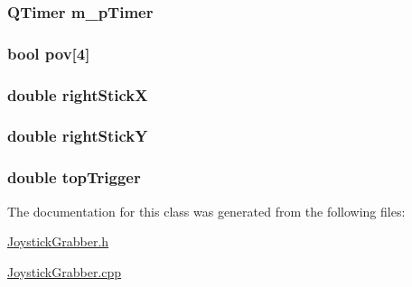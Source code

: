 \hypertarget{a00005_a8ba25017352f50469eddacb322dea1ea}{
\subsubsection[{m\-\_\-p\-Timer}]{\setlength{\rightskip}{0pt plus 5cm}Q\-Timer m\-\_\-p\-Timer\hspace{0.3cm}{\ttfamily [private]}}}\label{a00005_a8ba25017352f50469eddacb322dea1ea}
\hypertarget{a00005_ae68cabc9fc7cc8568adebca29ba3868d}{
\subsubsection[{pov}]{\setlength{\rightskip}{0pt plus 5cm}bool pov\mbox{[}4\mbox{]}}}\label{a00005_ae68cabc9fc7cc8568adebca29ba3868d}
\hypertarget{a00005_af0881450f92ff4ebb21414f6c6f124df}{
\subsubsection[{right\-Stick\-X}]{\setlength{\rightskip}{0pt plus 5cm}double right\-Stick\-X}}\label{a00005_af0881450f92ff4ebb21414f6c6f124df}
\hypertarget{a00005_afc18149eb56e03b5cf59623dfb93bdb3}{
\subsubsection[{right\-Stick\-Y}]{\setlength{\rightskip}{0pt plus 5cm}double right\-Stick\-Y}}\label{a00005_afc18149eb56e03b5cf59623dfb93bdb3}
\hypertarget{a00005_a3010a64bd66ee481f2f6c94f368993ef}{
\subsubsection[{top\-Trigger}]{\setlength{\rightskip}{0pt plus 5cm}double top\-Trigger}}\label{a00005_a3010a64bd66ee481f2f6c94f368993ef}


The documentation for this class was generated from the following files\-:\begin{DoxyCompactItemize}
\item 
\hyperlink{a00022}{Joystick\-Grabber.\-h}\item 
\hyperlink{a00021}{Joystick\-Grabber.\-cpp}\end{DoxyCompactItemize}
